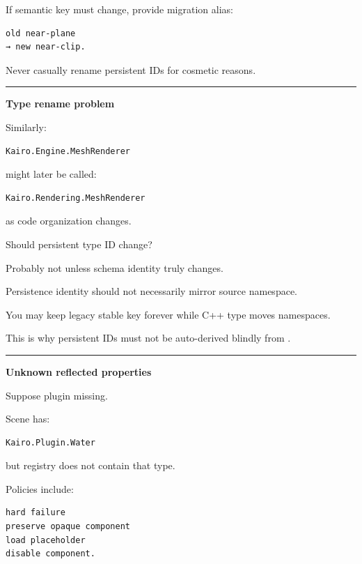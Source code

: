 If semantic key must change, provide migration alias:

\begin{verbatim}
old near-plane
→ new near-clip.
\end{verbatim}

Never casually rename persistent IDs for cosmetic reasons.

\begin{center}\rule{0.5\linewidth}{0.5pt}\end{center}

\textbf{Type rename problem}

Similarly:

\begin{verbatim}
Kairo.Engine.MeshRenderer
\end{verbatim}

might later be called:

\begin{verbatim}
Kairo.Rendering.MeshRenderer
\end{verbatim}

as code organization changes.

Should persistent type ID change?

Probably not unless schema identity truly changes.

Persistence identity should not necessarily mirror source namespace.

You may keep legacy stable key forever while C++ type moves namespaces.

This is why persistent IDs must not be auto-derived blindly from .

\begin{center}\rule{0.5\linewidth}{0.5pt}\end{center}

\textbf{Unknown reflected properties}

Suppose plugin missing.

Scene has:

\begin{verbatim}
Kairo.Plugin.Water
\end{verbatim}

but registry does not contain that type.

Policies include:

\begin{verbatim}
hard failure
preserve opaque component
load placeholder
disable component.
\end{verbatim}

